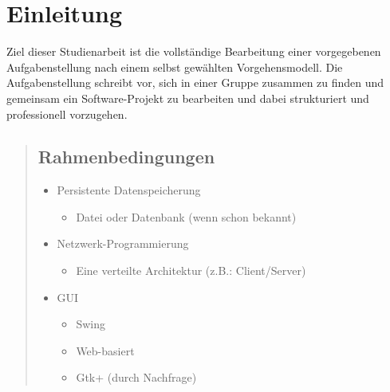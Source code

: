 \chapter{Einleitung}
Ziel dieser Studienarbeit ist die vollständige Bearbeitung einer vorgegebenen Aufgabenstellung
nach einem selbst gewählten Vorgehensmodell. Die Aufgabenstellung schreibt vor, sich in einer
Gruppe zusammen zu finden und gemeinsam ein Software-Projekt zu bearbeiten und dabei strukturiert
 und professionell vorzugehen.
\begin{quote}
    \section{Rahmenbedingungen}
    \renewcommand{\labelitemi}{•}
    \begin{itemize}
        \item Persistente Datenspeicherung
        \begin{itemize}
	    \item Datei oder Datenbank (wenn schon bekannt)
        \end{itemize}
        \item Netzwerk-Programmierung
        \begin{itemize}
	    \item Eine verteilte Architektur (z.B.: Client/Server)
        \end{itemize}
        \item GUI
        \begin{itemize}
	    \item Swing
	    \item Web-basiert
	    \item Gtk+ (durch Nachfrage)
        \end{itemize}
    \end{itemize}

\end{quote}
